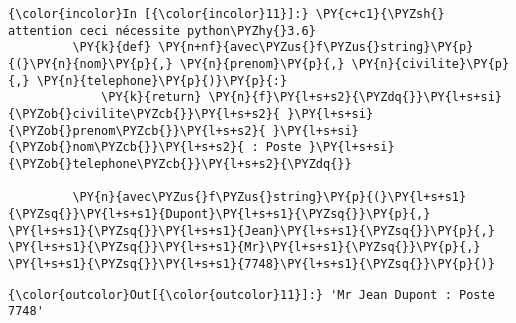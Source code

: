     \begin{Verbatim}[commandchars=\\\{\}]
{\color{incolor}In [{\color{incolor}11}]:} \PY{c+c1}{\PYZsh{} attention ceci nécessite python\PYZhy{}3.6}
         \PY{k}{def} \PY{n+nf}{avec\PYZus{}f\PYZus{}string}\PY{p}{(}\PY{n}{nom}\PY{p}{,} \PY{n}{prenom}\PY{p}{,} \PY{n}{civilite}\PY{p}{,} \PY{n}{telephone}\PY{p}{)}\PY{p}{:}
             \PY{k}{return} \PY{n}{f}\PY{l+s+s2}{\PYZdq{}}\PY{l+s+si}{\PYZob{}civilite\PYZcb{}}\PY{l+s+s2}{ }\PY{l+s+si}{\PYZob{}prenom\PYZcb{}}\PY{l+s+s2}{ }\PY{l+s+si}{\PYZob{}nom\PYZcb{}}\PY{l+s+s2}{ : Poste }\PY{l+s+si}{\PYZob{}telephone\PYZcb{}}\PY{l+s+s2}{\PYZdq{}}
         
         \PY{n}{avec\PYZus{}f\PYZus{}string}\PY{p}{(}\PY{l+s+s1}{\PYZsq{}}\PY{l+s+s1}{Dupont}\PY{l+s+s1}{\PYZsq{}}\PY{p}{,} \PY{l+s+s1}{\PYZsq{}}\PY{l+s+s1}{Jean}\PY{l+s+s1}{\PYZsq{}}\PY{p}{,} \PY{l+s+s1}{\PYZsq{}}\PY{l+s+s1}{Mr}\PY{l+s+s1}{\PYZsq{}}\PY{p}{,} \PY{l+s+s1}{\PYZsq{}}\PY{l+s+s1}{7748}\PY{l+s+s1}{\PYZsq{}}\PY{p}{)}
\end{Verbatim}


\begin{Verbatim}[commandchars=\\\{\}]
{\color{outcolor}Out[{\color{outcolor}11}]:} 'Mr Jean Dupont : Poste 7748'
\end{Verbatim}
            

    
    
    
